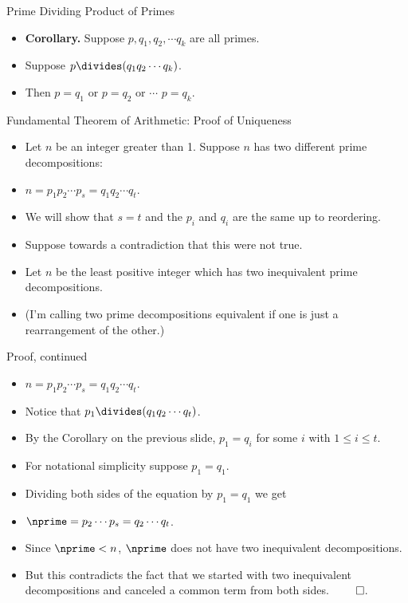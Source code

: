 \documentclass{beamer}
\begin{document}
\begin{frame}{Prime Dividing Product of Primes}

\begin{itemize}
  \item \textbf{Corollary.} Suppose $p, q_1, q_2, \cdots q_k$ are all primes.
  \item Suppose $p \divides (q_1 q_2 \cdots q_k)$.
  \item Then $p = q_1$ or $p=q_2$ or $\cdots$ $p=q_k$.
\end{itemize}
\end{frame}


\begin{frame}{Fundamental Theorem of Arithmetic: Proof of Uniqueness}
\begin{itemize}
  \item Let $n$ be an integer greater than 1. Suppose $n$ has two different
  prime decompositions:
  \item $n=p_1 p_2 \cdots p_s = q_1 q_2 \cdots q_t$.
  \item We will show that $s=t$ and the $p_i$ and $q_i$ are the same up to reordering.
  \item Suppose towards a contradiction that this were not true.
  \item Let $n$ be the least positive integer which has two inequivalent prime decompositions.
  \item (I'm calling two prime decompositions equivalent if one is just a rearrangement of the other.)
\end{itemize}
\end{frame}

\begin{frame}{Proof, continued}
\begin{itemize}
  \item $n=p_1 p_2 \cdots p_s = q_1 q_2 \cdots q_t$.
  \item Notice that $p_1 \divides (q_1 q_2 \cdots q_t)$.
  \item By the Corollary on the previous slide, $p_1 = q_i$ for some $i$ with $1\leq i \leq t$.
  \item For notational simplicity suppose $p_1=q_1$.
  \item Dividing both sides of the equation by $p_1 = q_1$ we get
  \item $\nprime = p_2 \cdots p_s = q_2 \cdots q_t$.
  \item Since $\nprime < n$, $\nprime$ does not have two inequivalent decompositions.
  \item But this contradicts the fact that we started with two inequivalent decompositions and canceled a common term from both sides. $\qed$.
\end{itemize}
\end{frame}
\end{document}
